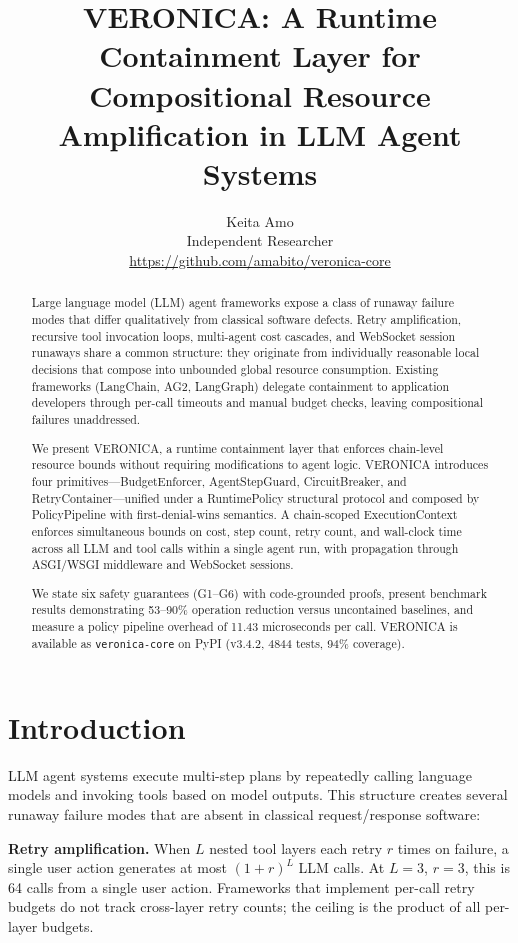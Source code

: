 \documentclass[11pt]{article}
\title{VERONICA: A Runtime Containment Layer for\\
Compositional Resource Amplification in LLM Agent Systems}
\author{
  Keita Amo\\
  Independent Researcher\\
  \url{https://github.com/amabito/veronica-core}
}
\date{}
\begin{document}
\maketitle

\begin{abstract}
Large language model (LLM) agent frameworks expose a class of runaway failure
modes that differ qualitatively from classical software defects. Retry
amplification, recursive tool invocation loops, multi-agent cost cascades, and
WebSocket session runaways share a common structure: they originate from
individually reasonable local decisions that compose into unbounded global
resource consumption. Existing frameworks (LangChain, AG2, LangGraph) delegate
containment to application developers through per-call timeouts and manual
budget checks, leaving compositional failures unaddressed.

We present VERONICA, a runtime containment layer that enforces chain-level
resource bounds without requiring modifications to agent logic. VERONICA
introduces four primitives---BudgetEnforcer, AgentStepGuard, CircuitBreaker,
and RetryContainer---unified under a RuntimePolicy structural protocol and
composed by PolicyPipeline with first-denial-wins semantics. A chain-scoped
ExecutionContext enforces simultaneous bounds on cost, step count, retry count,
and wall-clock time across all LLM and tool calls within a single agent run,
with propagation through ASGI/WSGI middleware and WebSocket sessions.

We state six safety guarantees (G1--G6) with code-grounded proofs, present
benchmark results demonstrating 53--90\% operation reduction versus uncontained
baselines, and measure a policy pipeline overhead of 11.43 microseconds per
call. VERONICA is available as \texttt{veronica-core} on PyPI (v3.4.2, 4844
tests, 94\% coverage).
\end{abstract}

\section{Introduction}
\label{sec:introduction}

LLM agent systems execute multi-step plans by repeatedly calling language
models and invoking tools based on model outputs. This structure creates
several runaway failure modes that are absent in classical request/response
software:

\textbf{Retry amplification.} When $L$ nested tool layers each retry $r$
times on failure, a single user action generates at most $(1 + r)^L$ LLM
calls. At $L{=}3$, $r{=}3$, this is 64 calls from a single user action.
Frameworks that implement per-call retry budgets do not track cross-layer
retry counts; the ceiling is the product of all per-layer budgets.
\end{document}
